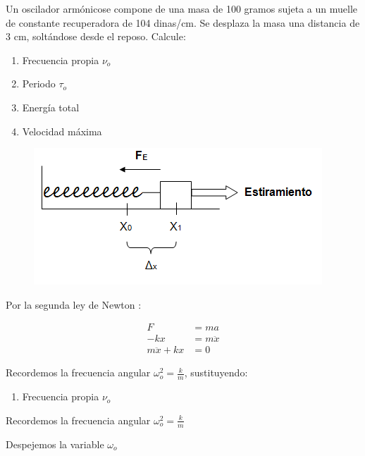 Un oscilador armónicose compone de una masa de 100 gramos sujeta a un muelle de constante
recuperadora de 104 dinas/cm. Se desplaza la masa una distancia de 3 cm, soltándose desde 
el reposo. Calcule:

\begin{enumerate}
    \item Frecuencia propia  $ \nu_{o}  $
    \item Periodo  $ \tau_{o}  $
    \item Energía total
    \item Velocidad máxima
\end{enumerate}

\vspace*{0.3 cm}

\begin{figure}[h]
    \centering
    \includegraphics[scale=0.75]{masa_resorte.png}
\end{figure}

Por la segunda ley de Newton :

\begin{align*}
    F&=ma \\
    -kx&=m \ddot{x} \\
    m \ddot{x}+kx&=0
\end{align*}

Recordemos la frecuencia angular $\omega_{o}^{2}=\frac{k}{m}$, sustituyendo:

\begin{enumerate}
    \item Frecuencia propia  $ \nu_{o}  $
\end{enumerate}

\vspace*{0.35cm}

Recordemos la frecuencia angular $\omega_{o}^{2}=\frac{k}{m}$

\vspace*{0.35cm}

Despejemos la variable $\omega_{o}$


